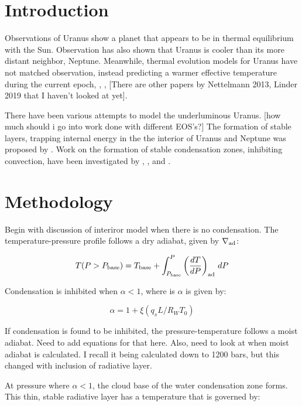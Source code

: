 \documentclass[11pt]{ucscthesisbs}
\begin{document}
\chapter{Introduction}
Observations of Uranus show a planet that appears to be in thermal equilibrium with the Sun. Observation has also shown that Uranus is cooler than its more distant neighbor, Neptune. Meanwhile, thermal evolution models for Uranus have not matched observation, instead predicting a warmer effective temperature during the current epoch\citep{fortney_2011}, \citep{podolak_1991}, \citep{hubbard_1995}, \citep{scheibe_2019} [There are other papers by Nettelmann 2013, Linder 2019 that I haven't looked at yet]. 

There have been various attempts to model the underluminous Uranus. [how much should i go into work done with different EOS's?] The formation of stable layers, trapping internal energy in the the interior of Uranus and Neptune was proposed by \citep{podolak_1991}. Work on the formation of stable condensation zones, inhibiting convection, have been investigated by \citep{friedson_2017}, \citep{leconte_2017}, and \citep{guillot_1995}. 


\chapter{Methodology}

Begin with discussion of interiror model when there is no condensation. The temperature-pressure profile follows a dry adiabat, given by $\nabla_{\rm ad}$:

\begin{equation}
T(P>P_{\rm base}) = T_{\rm base} + \int_{P_{\rm base}}^P\left(\frac{dT}{dP}\right)_{\rm ad}\,d P
\end{equation}

Condensation is inhibited when $\alpha < 1$, where is $\alpha$ is given by:

\begin{equation}
  \alpha = 1 + \xi (q_{s} L / R_{W} T_{0}) 
\end{equation}

If condensation is found to be inhibited, the pressure-temperature follows a moist adiabat. Need to add equations for that here. Also, need to look at when moist adiabat is calculated. I recall it being calculated down to 1200 bars, but this changed with inclusion of radiative layer.

At pressure where $\alpha < 1$, the cloud base of the water condensation zone forms. This thin, stable radiative layer has a temperature that is governed by:
\end{document}
